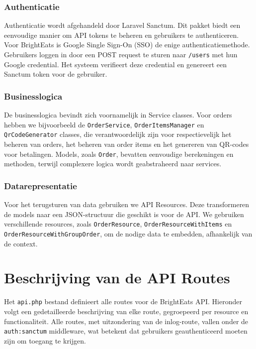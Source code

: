 \subsubsection{Authenticatie}

Authenticatie wordt afgehandeld door Laravel Sanctum. Dit pakket biedt een eenvoudige manier om API tokens te beheren en gebruikers te authenticeren. Voor BrightEats is Google Single Sign-On (SSO) de enige authenticatiemethode. Gebruikers loggen in door een POST request te sturen naar \texttt{/users} met hun Google credential. Het systeem verifieert deze credential en genereert een Sanctum token voor de gebruiker.

\subsubsection{Businesslogica}

De businesslogica bevindt zich voornamelijk in Service classes. Voor orders hebben we bijvoorbeeld de \texttt{OrderService}, \texttt{OrderItemsManager} en \texttt{QrCodeGenerator} classes, die verantwoordelijk zijn voor respectievelijk het beheren van orders, het beheren van order items en het genereren van QR-codes voor betalingen. Models, zoals \texttt{Order}, bevatten eenvoudige berekeningen en methoden, terwijl complexere logica wordt geabstraheerd naar services.

\subsubsection{Datarepresentatie}

Voor het terugsturen van data gebruiken we API Resources. Deze transformeren de models naar een JSON-structuur die geschikt is voor de API. We gebruiken verschillende resources, zoals \texttt{OrderResource}, \texttt{OrderResourceWithItems} en \texttt{OrderResourceWithGroupOrder}, om de nodige data te embedden, afhankelijk van de context.

\section{Beschrijving van de API Routes}

Het \texttt{api.php} bestand definieert alle routes voor de BrightEats API. Hieronder volgt een gedetailleerde beschrijving van elke route, gegroepeerd per resource en functionaliteit. Alle routes, met uitzondering van de inlog-route, vallen onder de \texttt{auth:sanctum} middleware, wat betekent dat gebruikers geauthenticeerd moeten zijn om toegang te krijgen.

